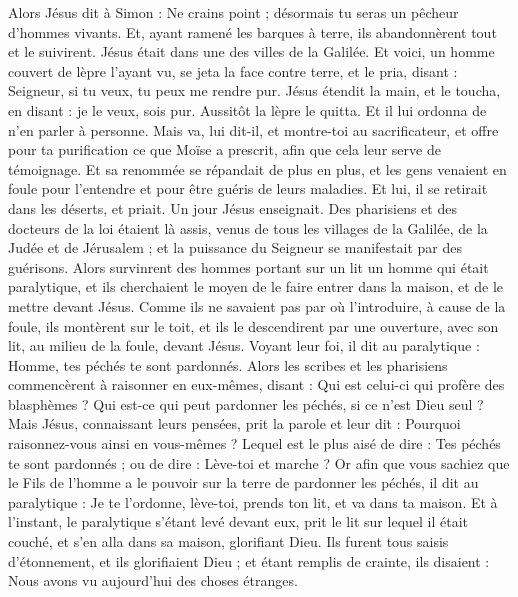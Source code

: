 \begin{multicols}{2}
Alors Jésus dit à Simon : Ne crains point ; désormais tu seras un pêcheur d'hommes vivants.
Et, ayant ramené les barques à terre, ils abandonnèrent tout et le suivirent.
Jésus était dans une des villes de la Galilée. Et voici, un homme couvert de lèpre l’ayant vu, se jeta la face contre terre, et le pria, disant : Seigneur, si tu veux, tu peux me rendre pur.
Jésus étendit la main, et le toucha, en disant : je le veux, sois pur. Aussitôt la lèpre le quitta.
Et il lui ordonna de n’en parler à personne. Mais va, lui dit-il, et montre-toi au sacrificateur, et offre pour ta purification ce que Moïse a prescrit, afin que cela leur serve de témoignage.
Et sa renommée se répandait de plus en plus, et les gens venaient en foule pour l’entendre et pour être guéris de leurs maladies.
Et lui, il se retirait dans les déserts, et priait.
Un jour Jésus enseignait. Des pharisiens et des docteurs de la loi étaient là assis, venus de tous les villages de la Galilée, de la Judée et de Jérusalem ; et la puissance du Seigneur se manifestait par des guérisons.
Alors survinrent des hommes portant sur un lit un homme qui était paralytique, et ils cherchaient le moyen de le faire entrer dans la maison, et de le mettre devant Jésus.
Comme ils ne savaient pas par où l’introduire, à cause de la foule, ils montèrent sur le toit, et ils le descendirent par une ouverture, avec son lit, au milieu de la foule, devant Jésus.
Voyant leur foi, il dit au paralytique : Homme, tes péchés te sont pardonnés.
Alors les scribes et les pharisiens commencèrent à raisonner en eux-mêmes, disant : Qui est celui-ci qui profère des blasphèmes ? Qui est-ce qui peut pardonner les péchés, si ce n’est Dieu seul ?
Mais Jésus, connaissant leurs pensées, prit la parole et leur dit : Pourquoi raisonnez-vous ainsi en vous-mêmes ?
Lequel est le plus aisé de dire : Tes péchés te sont pardonnés ; ou de dire : Lève-toi et marche ?
Or afin que vous sachiez que le Fils de l'homme a le pouvoir sur la terre de pardonner les péchés, il dit au paralytique : Je te l’ordonne, lève-toi, prends ton lit, et va dans ta maison.
Et à l'instant, le paralytique s'étant levé devant eux, prit le lit sur lequel il était couché, et s'en alla dans sa maison, glorifiant Dieu.
Ils furent tous saisis d'étonnement, et ils glorifiaient Dieu ; et étant remplis de crainte, ils disaient : Nous avons vu aujourd’hui des choses étranges.

\end{multicols}
